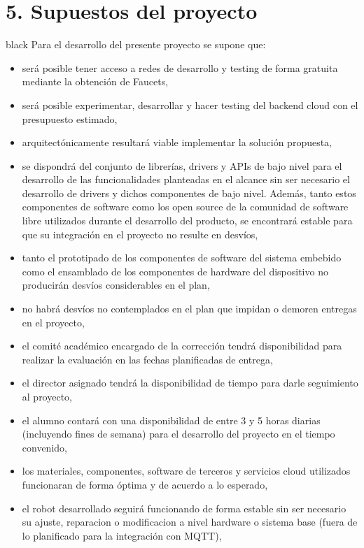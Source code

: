 \documentclass[
11pt, %
]{charter}
\begin{document}
\section{5. Supuestos del proyecto}
\label{sec:supuestos}

\begin{consigna}{black}
Para el desarrollo del presente proyecto se supone que:

\begin{itemize}
	\item será posible tener acceso a redes de desarrollo y testing de forma gratuita mediante la obtención de Faucets,
	\item será posible experimentar, desarrollar y hacer testing del backend cloud con el presupuesto estimado,
	\item arquitectónicamente resultará viable implementar la solución propuesta,
	\item se dispondrá del conjunto de librerías, drivers y APIs de bajo nivel para el desarrollo de las funcionalidades planteadas en el alcance sin ser necesario el desarrollo de drivers y dichos componentes de bajo nivel. Además, tanto estos componentes de software como los open source de la comunidad de software libre utilizados durante el desarrollo del producto, se encontrará estable para que su integración en el proyecto no resulte en desvíos,	
	\item tanto el prototipado de los componentes de software del sistema embebido como el ensamblado de los componentes de hardware del dispositivo no producirán desvíos considerables en el plan,
	\item no habrá desvíos no contemplados en el plan que impidan o demoren entregas en el proyecto,
	\item el comité académico encargado de la corrección tendrá disponibilidad para realizar la evaluación en las fechas planificadas de entrega,
	\item el director asignado tendrá la disponibilidad de tiempo para darle seguimiento al proyecto,
	\item el alumno contará con una disponibilidad de entre 3 y 5 horas diarias (incluyendo fines de semana) para el desarrollo del proyecto en el tiempo convenido,
	\item los materiales, componentes, software de terceros y servicios cloud utilizados funcionaran de forma óptima y de acuerdo a lo esperado,
	\item el robot desarrollado seguirá funcionando de forma estable sin ser necesario su ajuste, reparacion o modificacion a nivel hardware o sistema base (fuera de lo planificado para la integración con MQTT),

\end{itemize}
\end{consigna}
\end{document}
